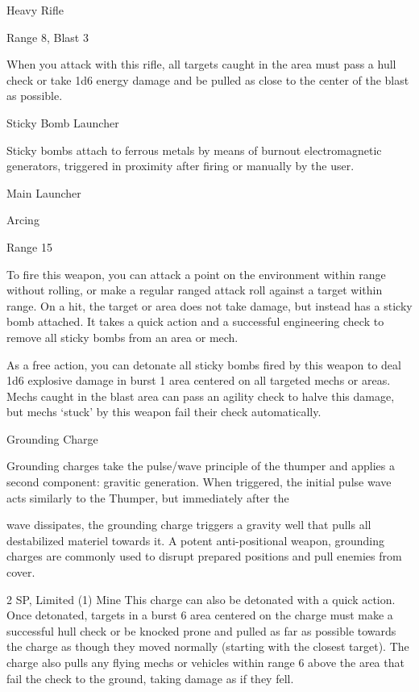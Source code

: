 Heavy Rifle
 
Range 8, Blast 3
 
When you attack with this rifle, all targets caught in the area must pass a hull check or take 1d6  
energy damage and be pulled as close to the center of the blast as possible.
 

Sticky Bomb Launcher  

Sticky bombs attach to ferrous metals by means of burnout electromagnetic generators, triggered in  
proximity after firing or manually by the user.   

Main Launcher
 
Arcing
 
Range 15
 
To fire this weapon, you can attack a point on the environment within range without rolling, or  
make a regular ranged attack roll against a target within range. On a hit, the target or area does  
not take damage, but instead has a sticky bomb attached. It takes a quick action and a  
successful engineering check to remove all sticky bombs from an area or mech.
 
As a free action, you can detonate all sticky bombs fired by this weapon to deal 1d6 explosive  
damage in burst 1 area centered on all targeted mechs or areas. Mechs caught in the blast area  
can pass an agility check to halve this damage, but mechs ‘stuck’ by this weapon fail their check  
automatically.
 

Grounding Charge  

Grounding charges take the pulse/wave principle of the thumper and applies a second component: gravitic  
generation. When triggered, the initial pulse wave acts similarly to the Thumper, but immediately after the  

wave dissipates, the grounding charge triggers a gravity well that pulls all destabilized materiel towards it. A  
potent anti-positional weapon, grounding charges are commonly used to disrupt prepared positions and  
pull enemies from cover.   

2 SP, Limited (1)  
Mine  
This charge can also be detonated with a quick action. Once detonated, targets in a burst 6 area  
centered on the charge must make a successful hull check or be knocked prone and pulled as  
far as possible towards the charge as though they moved normally (starting with the closest  
target). The charge also pulls any flying mechs or vehicles within range 6 above the area that fail  
the check to the ground, taking damage as if they fell.
 

